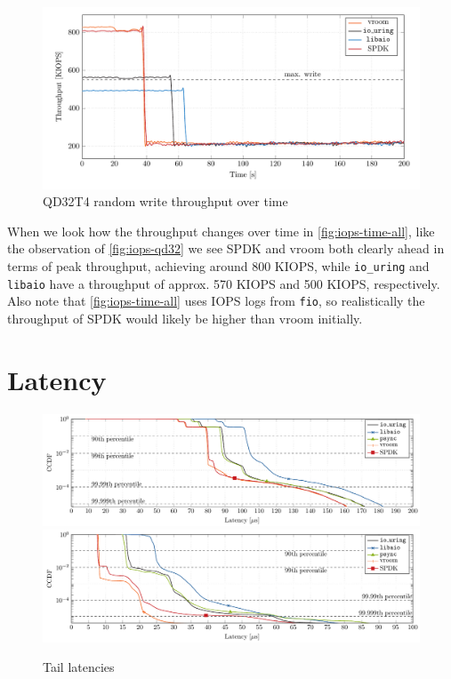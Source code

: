 \begin{figure}
  \centering
    \includegraphics[width=\textwidth]{figures/iops-time-tmp}
    \caption{QD32T4 random write throughput over time}
    \label{fig:iops-time-all}
\end{figure}

When we look how the throughput changes over time in \autoref{fig:iops-time-all}, like the observation of \autoref{fig:iops-qd32} we see SPDK and vroom both clearly ahead in terms of peak throughput, achieving around 800 KIOPS, while \texttt{io\_uring} and \texttt{libaio} have a throughput of approx. 570 KIOPS and 500 KIOPS, respectively. Also note that \autoref{fig:iops-time-all} uses IOPS logs from \texttt{fio}, so realistically the throughput of SPDK would likely be higher than vroom initially.

\section{Latency}
\begin{figure}
  \centering
   {\includegraphics[width=\textwidth]{figures/latency-ccdf-read} \label{fig:ccdf-read}}
   {\includegraphics[width=\textwidth]{figures/latency-ccdf-write} \label{fig:ccdf-write}}
  \caption{Tail latencies}
  \label{fig:ccdf}
\end{figure}

